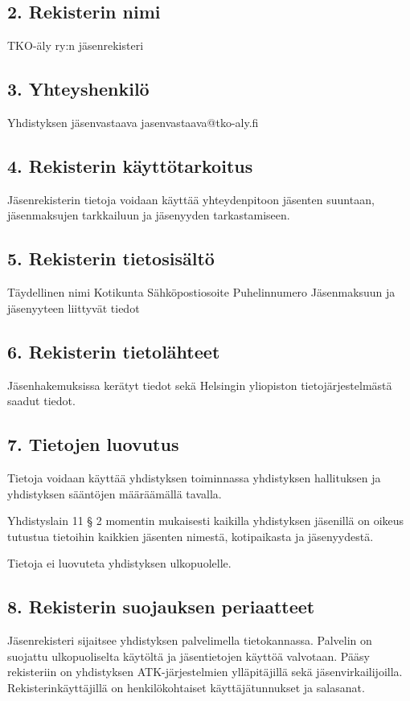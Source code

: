\documentclass[finnish]{tktltiki}
\begin{document}
\subsection*{2. Rekisterin nimi}
TKO-äly ry:n jäsenrekisteri

\subsection*{3. Yhteyshenkilö}
Yhdistyksen jäsenvastaava
jasenvastaava@tko-aly.fi

\subsection*{4. Rekisterin käyttötarkoitus}
Jäsenrekisterin tietoja voidaan käyttää yhteydenpitoon jäsenten suuntaan, jäsenmaksujen tarkkailuun ja jäsenyyden tarkastamiseen.

\subsection*{5. Rekisterin tietosisältö}
Täydellinen nimi
Kotikunta
Sähköpostiosoite
Puhelinnumero
Jäsenmaksuun ja jäsenyyteen liittyvät tiedot

\subsection*{6. Rekisterin tietolähteet}
Jäsenhakemuksissa kerätyt tiedot sekä Helsingin yliopiston tietojärjestelmästä saadut tiedot.

\subsection*{7. Tietojen luovutus}
Tietoja voidaan käyttää yhdistyksen toiminnassa yhdistyksen hallituksen ja yhdistyksen sääntöjen määräämällä tavalla.

Yhdistyslain 11 § 2 momentin mukaisesti kaikilla yhdistyksen jäsenillä on oikeus tutustua tietoihin kaikkien jäsenten nimestä, kotipaikasta ja jäsenyydestä.

Tietoja ei luovuteta yhdistyksen ulkopuolelle.

\subsection*{8. Rekisterin suojauksen periaatteet}
Jäsenrekisteri sijaitsee yhdistyksen palvelimella tietokannassa. Palvelin on suojattu ulkopuoliselta käytöltä ja jäsentietojen käyttöä valvotaan. Pääsy rekisteriin on yhdistyksen ATK-järjestelmien ylläpitäjillä sekä jäsenvirkailijoilla. Rekisterinkäyttäjillä on henkilökohtaiset käyttäjätunnukset ja salasanat.
\end{document}
